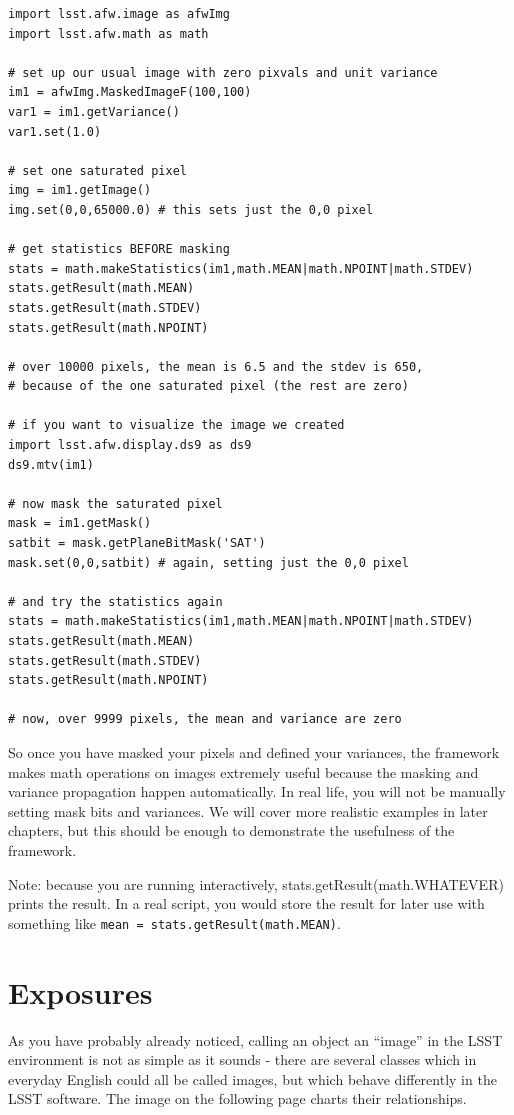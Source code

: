 \begin{verbatim}
import lsst.afw.image as afwImg
import lsst.afw.math as math

# set up our usual image with zero pixvals and unit variance
im1 = afwImg.MaskedImageF(100,100) 
var1 = im1.getVariance()
var1.set(1.0)

# set one saturated pixel
img = im1.getImage()
img.set(0,0,65000.0) # this sets just the 0,0 pixel

# get statistics BEFORE masking
stats = math.makeStatistics(im1,math.MEAN|math.NPOINT|math.STDEV)
stats.getResult(math.MEAN)
stats.getResult(math.STDEV)
stats.getResult(math.NPOINT)

# over 10000 pixels, the mean is 6.5 and the stdev is 650,
# because of the one saturated pixel (the rest are zero)

# if you want to visualize the image we created
import lsst.afw.display.ds9 as ds9
ds9.mtv(im1)

# now mask the saturated pixel
mask = im1.getMask()
satbit = mask.getPlaneBitMask('SAT')
mask.set(0,0,satbit) # again, setting just the 0,0 pixel

# and try the statistics again
stats = math.makeStatistics(im1,math.MEAN|math.NPOINT|math.STDEV)
stats.getResult(math.MEAN)
stats.getResult(math.STDEV)
stats.getResult(math.NPOINT)

# now, over 9999 pixels, the mean and variance are zero
\end{verbatim}

So once you have masked your pixels and defined your variances, the
framework makes math operations on images extremely useful because
the masking and variance propagation happen automatically.  In real
life, you will not be manually setting mask bits and variances.  We
will cover more realistic examples in later chapters, but this should
be enough to demonstrate the usefulness of the framework.

Note: because you are running interactively,
stats.getResult(math.WHATEVER) prints the result.  In a real script,
you would store the result for later use with something like
\texttt{mean = stats.getResult(math.MEAN)}.


\section{Exposures}

As you have probably already noticed, calling an object an ``image''
in the LSST environment is not as simple as it sounds - there are
several classes which in everyday English could all be called images,
but which behave differently in the LSST software.  The image on the
following page charts their relationships.

